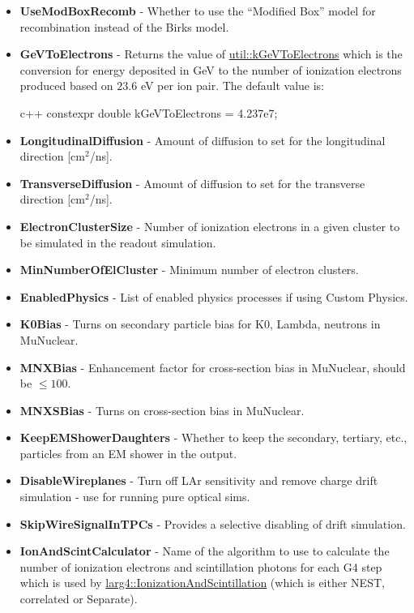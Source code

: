 \documentclass[8pt]{refart}
\begin{document}
\begin{itemize}
        \begin{code}[36]{c++}
        constexpr double kModBoxB       = 0.212;
        \end{code}
    \item \textbf{UseModBoxRecomb} - Whether to use the ``Modified Box'' model for recombination instead of the Birks model.
    \item \textbf{GeVToElectrons} - Returns the value of \href{https://internal.dunescience.org/doxygen/PhysicalConstants_8h_source.html}{util::kGeVToElectrons} which is the conversion for energy deposited in GeV to the number of ionization electrons produced based on $23.6$ eV per ion pair.  The default value is:
        \begin{code}[55]{c++}
        constexpr double kGeVToElectrons = 4.237e7;
        \end{code}
    \item \textbf{LongitudinalDiffusion} - Amount of diffusion to set for the longitudinal direction [cm$^2$/ns]. 
    \item \textbf{TransverseDiffusion} - Amount of diffusion to set for the transverse direction [cm$^2$/ns].
    \item \textbf{ElectronClusterSize} - Number of ionization electrons in a given cluster to be simulated in the readout simulation.
    \item \textbf{MinNumberOfElCluster} - Minimum number of electron clusters.
    \item \textbf{EnabledPhysics} - List of enabled physics processes if using Custom Physics.
    \item \textbf{K0Bias} - Turns on secondary particle bias for K0, Lambda, neutrons in MuNuclear.
    \item \textbf{MNXBias} - Enhancement factor for cross-section bias in MuNuclear, should be $\leq 100$.
    \item \textbf{MNXSBias} - Turns on cross-section bias in MuNuclear.
    \item \textbf{KeepEMShowerDaughters} - Whether to keep the secondary, tertiary, etc., particles from an EM shower in the output.
    \item \textbf{DisableWireplanes} - Turn off LAr sensitivity and remove charge drift simulation - use for running pure optical sims.
    \item \textbf{SkipWireSignalInTPCs} - Provides a selective disabling of drift simulation.
    \item \textbf{IonAndScintCalculator} - Name of the algorithm to use to calculate the number of ionization electrons and scintillation photons for each G4 step which is used by \href{https://internal.dunescience.org/doxygen/classlarg4_1_1IonizationAndScintillation.html}{larg4::IonizationAndScintillation} (which is either NEST, correlated or Separate).

\end{itemize}
\end{document}
